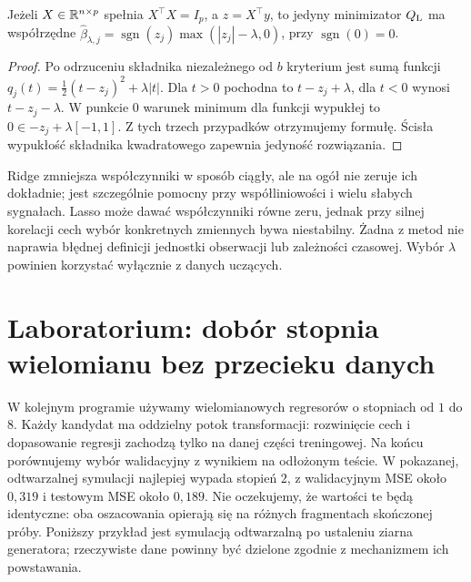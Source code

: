 \begin{twierdzenie}
\label{thm:lasso-soft}
Jeżeli $X\in\mathbb R^{n\times p}$ spełnia $X^\top X=I_p$,
a $z=X^\top y$, to jedyny minimizator $Q_{\rm L}$ ma
współrzędne
$\widehat\beta_{\lambda,j}=\operatorname{sgn}(z_j)
\max(|z_j|-\lambda,0)$, przy $\operatorname{sgn}(0)=0$.
\end{twierdzenie}
\begin{proof}
Po odrzuceniu składnika niezależnego od $b$ kryterium
jest sumą funkcji $q_j(t)=\frac12(t-z_j)^2+\lambda|t|$.
Dla $t>0$ pochodna to $t-z_j+\lambda$, dla $t<0$
wynosi $t-z_j-\lambda$. W punkcie $0$ warunek minimum
dla funkcji wypukłej to $0\in-z_j+\lambda[-1,1]$.
Z tych trzech przypadków otrzymujemy formułę.
Ścisła wypukłość składnika kwadratowego zapewnia
jedyność rozwiązania.
\end{proof}

\begin{uwaga}
Ridge zmniejsza współczynniki w sposób ciągły, ale na ogół
nie zeruje ich dokładnie; jest szczególnie pomocny przy
współliniowości i wielu słabych sygnałach.
Lasso może dawać współczynniki równe zeru, jednak przy
silnej korelacji cech wybór konkretnych zmiennych bywa
niestabilny. Żadna z metod nie naprawia błędnej definicji
jednostki obserwacji lub zależności czasowej. Wybór
$\lambda$ powinien korzystać wyłącznie z danych uczących.
\end{uwaga}

\section{Laboratorium: dobór stopnia wielomianu bez przecieku danych}
W kolejnym programie używamy wielomianowych regresorów
o stopniach od $1$ do $8$. Każdy kandydat ma oddzielny
potok transformacji: rozwinięcie cech i dopasowanie
regresji zachodzą tylko na danej części treningowej.
Na końcu porównujemy wybór walidacyjny z wynikiem na
odłożonym teście. W pokazanej, odtwarzalnej symulacji
najlepiej wypada stopień $2$, z walidacyjnym MSE około
$0{,}319$ i testowym MSE około $0{,}189$. Nie oczekujemy,
że wartości te będą identyczne: oba oszacowania opierają
się na różnych fragmentach skończonej próby.
Poniższy przykład jest symulacją
odtwarzalną po ustaleniu ziarna generatora; rzeczywiste
dane powinny być dzielone zgodnie z mechanizmem ich
powstawania.

